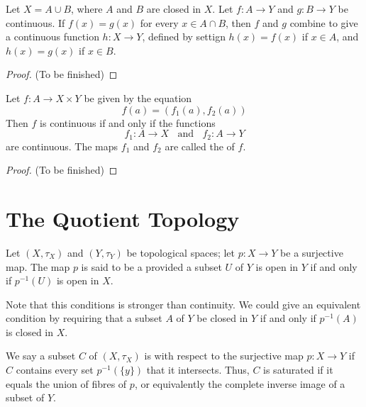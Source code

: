 \documentclass[12pt, a4paper, oneside, openright, titlepage]{book}
\begin{document}
\begin{theorem}
    Let $X = A\cup B$, where $A$ and $B$ are closed in $X$. Let $f:A\rightarrow Y$ and $g:B\rightarrow Y$ be continuous. If $f(x) = g(x)$ for every $x \in A\cap B$, then $f$ and $g$ combine to give a continuous function $h:X\rightarrow Y$, defined by settign $h(x) = f(x)$ if $x \in A$, and $h(x) = g(x)$ if $x \in B$.
\end{theorem}
\begin{proof}
    (To be finished)
\end{proof}

\begin{theorem}
    Let $f:A\rightarrow X\times Y$ be given by the equation \begin{equation*}
        f(a) = (f_1(a), f_2(a))
    \end{equation*}
    Then $f$ is continuous if and only if the functions \begin{equation*}
        f_1:A\rightarrow X\;\;\text{ and }\;\;f_2:A\rightarrow Y
    \end{equation*}
    are continuous. The maps $f_1$ and $f_2$ are called the  of $f$.
\end{theorem}
\begin{proof}
    (To be finished)
\end{proof}



\section{The Quotient Topology}

\begin{definition}
    Let $(X,\tau_X)$ and $(Y,\tau_Y)$ be topological spaces; let $p:X\rightarrow Y$ be a surjective map. The map $p$ is said to be a  provided a subset $U$ of $Y$ is open in $Y$ if and only if $p^{-1}(U)$ is open in $X$.
\end{definition}

Note that this conditions is stronger than continuity. We could give an equivalent condition by requiring that a subset $A$ of $Y$ be closed in $Y$ if and only if $p^{-1}(A)$ is closed in $X$.

\begin{definition}
    We say a subset $C$ of $(X,\tau_X)$ is  with respect to the surjective map $p:X\rightarrow Y$ if $C$ contains every set $p^{-1}(\{y\})$ that it intersects. Thus, $C$ is saturated if it equals the union of fibres of $p$, or equivalently the complete inverse image of a subset of $Y$. 
\end{definition}
\end{document}
